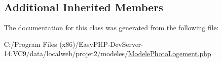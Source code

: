 \subsection*{Additional Inherited Members}


The documentation for this class was generated from the following file\+:\begin{DoxyCompactItemize}
\item 
C\+:/\+Program Files (x86)/\+Easy\+P\+H\+P-\/\+Dev\+Server-\/14.\+V\+C9/data/localweb/projet2/modeles/\hyperlink{_modele_photo_logement_8php}{Modele\+Photo\+Logement.\+php}\end{DoxyCompactItemize}
